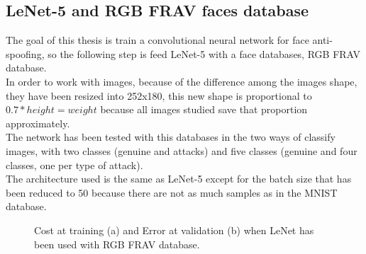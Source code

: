 \subsection{LeNet-5 and RGB FRAV faces database} \label{Lenet-FRAV}
The goal of this thesis is train a convolutional neural network for face anti-spoofing, so the following step is feed LeNet-5 with a face databases, RGB FRAV database.\\

In order to work with images, because of the difference among the images shape, they have been resized into 252x180, this new shape is proportional to $0.7*height = weight$ because all images studied save that proportion approximately.\\

The network has been tested with this databases in the two ways of classify images, with two classes (genuine and attacks) and five classes (genuine and four classes, one per type of attack).\\ %

The architecture used is the same as LeNet-5 except for the batch size that has been reduced to 50 because there are not as much samples as in the MNIST database.\\

\begin{figure}[tb]
\centering
{}
\caption{Cost at training (a) and Error at validation (b) when LeNet has been used with RGB FRAV database.}
\label{fig:Lenet_FRAV}
\end{figure}

